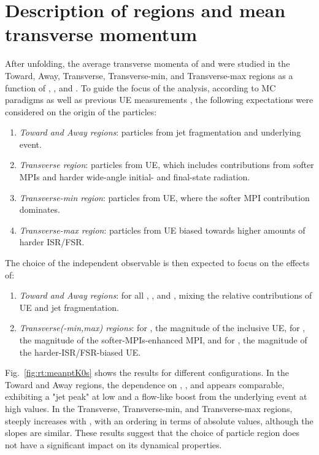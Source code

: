 \section{Description of regions and mean transverse momentum}

After unfolding, the average transverse momenta \meanpt of \KOs and \LA were studied in the Toward, Away, Transverse, Transverse-min, and Transverse-max regions as a function of \NT, \NTmin, and \NTmax. To guide the focus of the analysis, according to MC paradigms as well as previous UE measurements \cite{fieldUnderlyingEventHadronic2012, ortizEnergyDependenceUnderlyingevent2021}, the following expectations were considered on the origin of the particles:
\begin{enumerate}
\item \textit{Toward and Away regions}: particles from jet fragmentation and underlying event.
\item \textit{Transverse region}: particles from UE, which includes contributions from softer MPIs and harder wide-angle initial- and final-state radiation.
\item \textit{Transverse-min region}: particles from UE, where the softer MPI contribution dominates.
\item \textit{Transverse-max region}: particles from UE biased towards higher amounts of harder ISR/FSR.
\end{enumerate}

The choice of the independent observable is then expected to focus on the effects of:
\begin{enumerate}
\item \textit{Toward and Away regions}: for all \NT, \NTmin, and \NTmax, mixing the relative contributions of UE and jet fragmentation.
\item \textit{Transverse(-min,max) regions}: for \NT, the magnitude of the inclusive UE, for \NTmin, the magnitude of the softer-MPIs-enhanced MPI, and for \NTmax, the magnitude of the harder-ISR/FSR-biased UE.
\end{enumerate}

Fig.~\ref{fig:rt:meanptK0s} shows the \KOs \meanpt results for different configurations. In the Toward and Away regions, the dependence on \NT, \NTmin, and \NTmax appears comparable, exhibiting a "jet peak" at low \NT and a flow-like boost from the underlying event at high \NT values. In the Transverse, Transverse-min, and Transverse-max regions, \meanpt steeply increases with \NT, with an ordering in terms of absolute values, although the slopes are similar. These results suggest that the choice of particle region does not have a significant impact on its dynamical properties.

